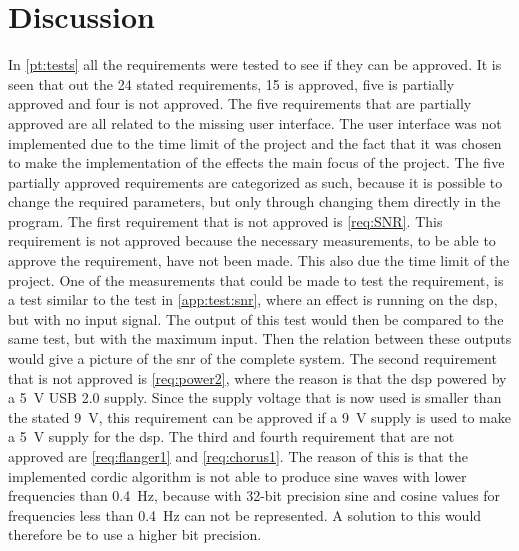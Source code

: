 \section{Discussion}\label{sec:discussion}

In \autoref{pt:tests} all the requirements were tested to see if they can be approved. It is seen that out the 24 stated requirements, 15 is approved, five is partially approved and four is not approved. 
The five requirements that are partially approved are all related to the missing user interface. The user interface was not implemented due to the time limit of the project and the fact that it was chosen to make the implementation of the effects the main focus of the project. The five partially approved requirements are categorized as such, because it is possible to change the required parameters, but only through changing them directly in the program. The first requirement that is not approved is \autoref{req:SNR}. This requirement is not approved because the necessary measurements, to be able to approve the requirement, have not been made. This also due the time limit of the project. One of the measurements that could be made to test the requirement, is a test similar to the test in \autoref{app:test:snr}, where an effect is running on the \gls{dsp}, but with no input signal. The output of this test would then be compared to the same test, but with the maximum input. Then the relation between these outputs would give a picture of the \gls{snr} of the complete system.
The second requirement that is not approved is \autoref{req:power2}, where the reason is that the \gls{dsp} powered by a \SI{5}{\volt} USB 2.0 supply. Since the supply voltage that is now used is smaller than the stated \SI{9}{\volt}, this requirement can be approved if a \SI{9}{\volt} supply is used to make a \SI{5}{\volt} supply for the \gls{dsp}.
The third and fourth requirement that are not approved are \autoref{req:flanger1} and \autoref{req:chorus1}. The reason of this is that the implemented \gls{cordic} algorithm is not able to produce sine waves with lower frequencies than \SI{0.4}{\hertz}, because with 32-bit precision sine and cosine values for frequencies less than \SI{0.4}{\hertz} can not be represented. A solution to this would therefore be to use a higher bit precision. \\

